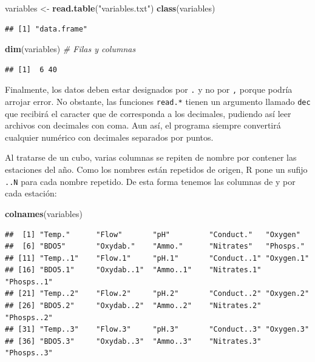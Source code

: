 \documentclass[
  spanish,
]{article}
\newenvironment{Shaded}{\begin{snugshade}}{\end{snugshade}}
\newcommand{\CommentTok}[1]{\textcolor[rgb]{0.56,0.35,0.01}{\textit{#1}}}
\newcommand{\KeywordTok}[1]{\textcolor[rgb]{0.13,0.29,0.53}{\textbf{#1}}}
\newcommand{\NormalTok}[1]{#1}
\newcommand{\StringTok}[1]{\textcolor[rgb]{0.31,0.60,0.02}{#1}}
\begin{document}
\begin{Shaded}
\begin{Highlighting}[]
\NormalTok{variables \textless{}{-}}\StringTok{ }\KeywordTok{read.table}\NormalTok{(}\StringTok{"variables.txt"}\NormalTok{)}
\KeywordTok{class}\NormalTok{(variables)}
\end{Highlighting}
\end{Shaded}

\begin{verbatim}
## [1] "data.frame"
\end{verbatim}

\begin{Shaded}
\begin{Highlighting}[]
\KeywordTok{dim}\NormalTok{(variables) }\CommentTok{\# Filas y columnas}
\end{Highlighting}
\end{Shaded}

\begin{verbatim}
## [1]  6 40
\end{verbatim}

Finalmente, los datos deben estar designados por \texttt{.} y no por \texttt{,} porque podría arrojar error. No obstante, las funciones \texttt{read.*} tienen un argumento llamado \texttt{dec} que recibirá el caracter que de corresponda a los decimales, pudiendo así leer archivos con decimales con coma. Aun así, el programa siempre convertirá cualquier numérico con decimales separados por puntos.

Al tratarse de un cubo, varias columnas se repiten de nombre por contener las estaciones del año. Como los nombres están repetidos de origen, R pone un sufijo \texttt{..N} para cada nombre repetido. De esta forma tenemos las columnas de y por cada estación:

\begin{Shaded}
\begin{Highlighting}[]
\KeywordTok{colnames}\NormalTok{(variables)}
\end{Highlighting}
\end{Shaded}

\begin{verbatim}
##  [1] "Temp."      "Flow"       "pH"         "Conduct."   "Oxygen"    
##  [6] "BDO5"       "Oxydab."    "Ammo."      "Nitrates"   "Phosps."   
## [11] "Temp..1"    "Flow.1"     "pH.1"       "Conduct..1" "Oxygen.1"  
## [16] "BDO5.1"     "Oxydab..1"  "Ammo..1"    "Nitrates.1" "Phosps..1" 
## [21] "Temp..2"    "Flow.2"     "pH.2"       "Conduct..2" "Oxygen.2"  
## [26] "BDO5.2"     "Oxydab..2"  "Ammo..2"    "Nitrates.2" "Phosps..2" 
## [31] "Temp..3"    "Flow.3"     "pH.3"       "Conduct..3" "Oxygen.3"  
## [36] "BDO5.3"     "Oxydab..3"  "Ammo..3"    "Nitrates.3" "Phosps..3"
\end{verbatim}
\end{document}
